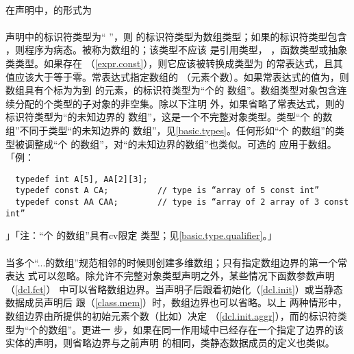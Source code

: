 \paragraph{}
在声明中，的形式为                                              \\
\mbox{\qquad\tm{D1 [}  \tm{]}
  }                                     \\
声明中的标识符类型为`` ''，则
的标识符类型为数组类型；如果的标识符类型包含
，则程序为病态。被称为数组的；该类型不应该
是引用类型， ，函数类型或抽象类类型。如果存在
（\ref{expr.const}），则它应该被转换成类型为
的常表达式，且其值应该大于等于零。常表达式指定数组的
（元素个数）。如果常表达式的值为，则数组具有个标为为到
的元素，的标识符类型为``个的
数组''。数组类型对象包含连续分配的个类型的子对象的非空集。除以下注明
外，如果省略了常表达式，则的标识符类型为``的未知边界的
数组''，这是一个不完整对象类型。类型``个
的数组''不同于类型``的未知边界的
数组''，见\ref{basic.types}。任何形如``个
的数组''的类型被调整成``个
的数组''，对``的未知边界的数组''也类似。可选的
应用于数组。「例：
\begin{lstlisting}
  typedef int A[5], AA[2][3];
  typedef const A CA;          // type is “array of 5 const int”
  typedef const AA CAA;        // type is “array of 2 array of 3 const int”
\end{lstlisting}」「注：``个 的数组''具有cv限定
类型；见\ref{basic.type.qualifier}。」

\paragraph{}
当多个``...的数组''规范相邻的时候则创建多维数组；只有指定数组边界的第一个常表达
式可以忽略。除允许不完整对象类型声明之外，某些情况下函数参数声明（\ref{dcl.fct}）
中可以省略数组边界。当声明子后跟着初始化（\ref{dcl.init}）或当静态数据成员声明后
跟（\ref{class.mem}）时，数组边界也可以省略。以上
两种情形中，数组边界由所提供的初始元素个数（比如）决定
（\ref{dcl.init.aggr}），而的标识符类型为``个的数组''。更进一
步，如果在同一作用域中已经存在一个指定了边界的该实体的声明，则省略边界与之前声明
的相同，类静态数据成员的定义也类似。


